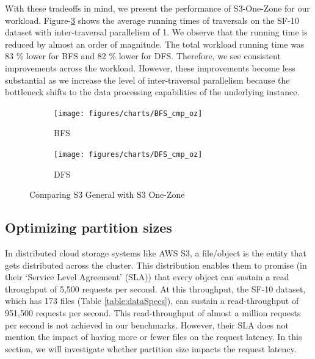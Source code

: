 \medskip
With these tradeoffs in mind, we present the performance of S3-One-Zone for our
workload. Figure-\ref{fig:ozCmp} shows the average running times of traversals
on the SF-10 dataset with inter-traversal parallelism of 1. We observe that the
running time is reduced by almost an order of magnitude. The total workload
running time was 83 \% lower for BFS and 82 \% lower for DFS. Therefore, we see
consistent improvements across the workload. However, these improvements become less
substantial as we increase the level of inter-traversal parallelism because the
bottleneck shifts to the data processing capabilities of the underlying
instance.
\begin{figure}[ht]
    \centering
    \begin{subfigure}[b]{0.48\textwidth}
        \centering
        \texttt{[image: figures/charts/BFS\_cmp\_oz]}
        \caption{BFS}
        \label{fig:bfsCmpOz}
    \end{subfigure}
    \hfill
    \begin{subfigure}[b]{0.48\textwidth}
        \texttt{[image: figures/charts/DFS\_cmp\_oz]}
        \caption{DFS}
        \label{fig:dfsCmpOz}
    \end{subfigure}
    \caption{Comparing S3 General with S3 One-Zone}
    \label{fig:ozCmp}
\end{figure}

\subsection{Optimizing partition sizes}\label{sec:partitionSize}
In distributed cloud storage systems like AWS S3, a file/object is the entity 
that gets distributed across the cluster. This distribution enables them to
promise (in their `Service Level Agreement' (SLA)) that every object
can sustain a read throughput of 5,500 requests per second. At this throughput,
the SF-10 dataset, which has 173 files (Table \ref{table:dataSpecs}), can
sustain a read-throughput of 951,500 requests per second. This read-throughput
of almost a million requests per second is not achieved in our
benchmarks. However, their SLA does not mention the impact of having more or
fewer files on the request latency. In this section, we will investigate whether
partition size impacts the request latency.

